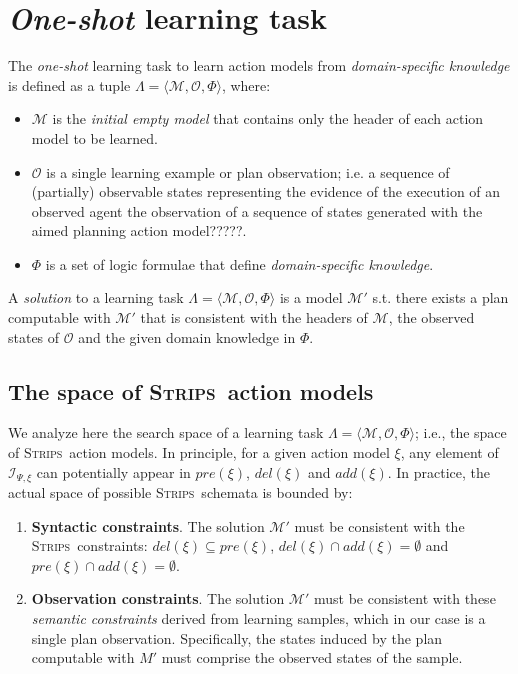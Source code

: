 \documentclass{article}
\newcommand{\tup}[1]{{\langle #1 \rangle}}
\newcommand{\strips}{\textsc{Strips}}
\begin{document}
\section{{\em One-shot} learning task}
\label{sec:learning}

The {\em one-shot} learning task to learn action models from {\em domain-specific knowledge} is defined as a tuple $\Lambda=\tup{\mathcal{M},{\mathcal O},\Phi}$, where:

\begin{itemize}
\item $\mathcal{M}$ is the {\em initial empty model} that contains only the header of each action model to be learned.
\item $\mathcal{O}$ is a single learning example or plan observation; i.e. a sequence of (partially) observable states representing the evidence of the execution of an observed agent \textcolor[rgb]{1.00,0.00,0.00}{the observation of a sequence of states generated with the aimed planning action model?????}.
\item $\Phi$ is a set of logic formulae that define {\em domain-specific knowledge}.
\end{itemize}

A {\em solution} to a learning task $\Lambda=\tup{\mathcal{M},{\mathcal O},\Phi}$ is a model $\mathcal{M}'$ s.t. there exists a plan computable with $\mathcal{M}'$ that is consistent with the headers of $\mathcal{M}$, the observed states of $\mathcal{O}$ and the given domain knowledge in $\Phi$.

\subsection{The space of \strips\ action models}

We analyze here the search space of a learning task $\Lambda=\tup{\mathcal{M},{\mathcal O},\Phi}$; i.e., the space of \strips\ action models. In principle, for a given action model $\xi$, any element of ${\mathcal I}_{\Psi,\xi}$ can potentially appear in $pre(\xi)$, $del(\xi)$ and $add(\xi)$. In practice, the actual space of possible \strips\ schemata is bounded by:

\begin{enumerate}
\item {\bf Syntactic constraints}. The solution $\mathcal{M}'$ must be consistent with the \strips\ constraints: $del(\xi)\subseteq pre(\xi)$, $del(\xi)\cap add(\xi)=\emptyset$ and $pre(\xi)\cap add(\xi)=\emptyset$.
\item {\bf Observation constraints}. The solution $\mathcal{M}'$ must be consistent with these \emph{semantic constraints} derived from  learning samples, which in our case is a single plan observation. Specifically, the states induced by the plan computable with $M'$ must comprise the observed states of the sample.
\end{enumerate}
\end{document}

